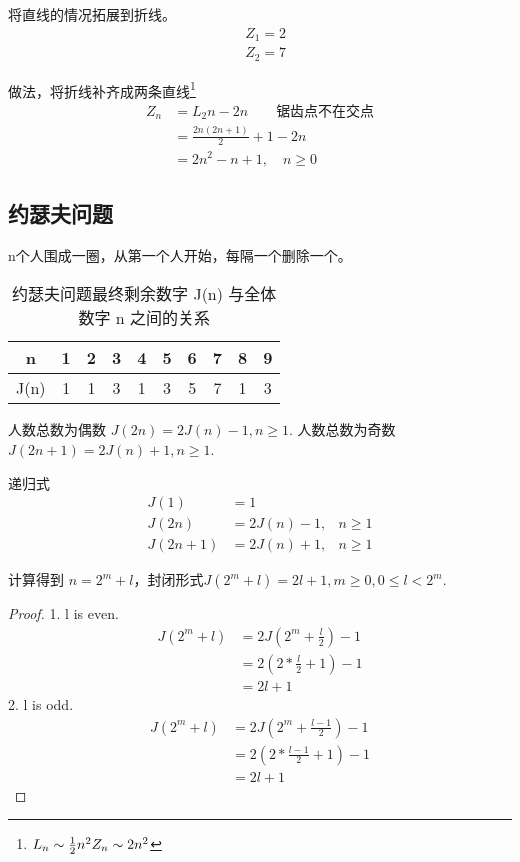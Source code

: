 \begin{remark}
	将直线的情况拓展到折线。
	\begin{align*}
		&Z_1 = 2\\
		&Z_2 = 7
	\end{align*}
\end{remark}
做法，将折线补齐成两条直线\footnote{$ L_n \sim \frac{1}{2}n^2\\ Z_n \sim 2n^2 $}
\begin{align*}
	Z_n& = L_2n-2n \qquad\text{锯齿点不在交点}\\
	&=\frac{2n(2n+1)}{2}+1 - 2n\\
	&=2n^2-n+1, \quad n\geqslant 0
\end{align*}

\subsection{约瑟夫问题}
n个人围成一圈，从第一个人开始，每隔一个删除一个。

\begin{table}[htbp]
	\centering
	\small
	\caption{约瑟夫问题最终剩余数字 J(n) 与全体数字 n 之间的关系}
	\begin{tabular}{c|ccccccccc}
		\toprule
		n & 1 & 2 & 3 & 4 & 5 & 6 & 7 & 8 & 9 \\  
		\midrule
		J(n) & 1 & 1 & 3 & 1 & 3 & 5 & 7 & 1 & 3\\
		\bottomrule
	\end{tabular}%
	\label{tab:reg}%
\end{table}%

人数总数为偶数 $ J(2n)   = 2J(n)-1, n\geqslant 1 $.
人数总数为奇数 $ J(2n+1) = 2J(n)+1, n\geqslant 1 $.

递归式
\begin{align*}
	J(1)  &= 1&\\
	J(2n) &= 2J(n)-1,&  n\geqslant 1 \\
	J(2n+1) &= 2J(n)+1,&  n\geqslant 1 
\end{align*}

计算得到 $ n = 2^m+l $，封闭形式$ J(2^m+l) = 2l+1, m\geqslant 0, 0\leqslant l <2^m  $.
\begin{proof}
	1. l is even.
	\begin{align*}
		J(2^m+l) &= 2J(2^m+\frac{l}{2})-1\\
		&=2(2*\frac{l}{2}+1)-1\\
		&=2l+1
	\end{align*}
	2. l is odd.
	\begin{align*}
		J(2^m+l) &= 2J(2^m+\frac{l-1}{2})-1\\
		&=2(2*\frac{l-1}{2}+1)-1\\
		&=2l+1
	\end{align*}
\end{proof}

